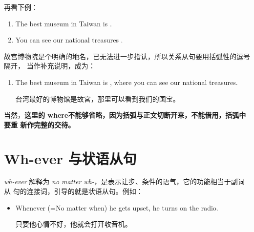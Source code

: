 再看下例：
\begin{enumerate}
\item   The best museum in Taiwan is  .
\item   You can see our national treasures .
\end{enumerate}
故宫博物院是个明确的地名，已无法进一步指认，所以关系从句要用括弧性的逗号隔开，
当作补充说明，成为：
\begin{enumerate}[resume]
\item The best museum in Taiwan is , where you
  can see our national treasures.

  台湾最好的博物馆是故宮，那里可以看到我们的国宝。
\end{enumerate}
当然，\textbf{这里的 where不能够省略，因为括弧与正文切断开来，不能借用，括弧中要重
  新作完整的交待。}

\section{Wh-ever 与状语从句}

\emph{wh-ever} 解释为 \emph{no matter wh-}，是表示让步、条件的语气，它的功能相当于副词从
句的连接词，引导的就是状语从句。例如：

\begin{itemize}
\item Whenever (=No matter when) he gets upset, he turns on the radio.

  只要他心情不好，他就会打开收音机。
\end{itemize}

